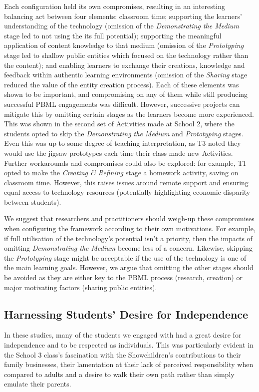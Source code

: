Each configuration held its own compromises, resulting in an interesting balancing act between four elements: classroom time; supporting the learners' understanding of the technology (omission of the \textit{Demonstrating the Medium} stage led to not using the its full potential); supporting the meaningful application of content knowledge to that medium (omission of the \textit{Prototyping} stage led to shallow public entities which focused on the technology rather than the content); and enabling learners to exchange their creations, knowledge and feedback within authentic learning environments (omission of the \textit{Sharing} stage reduced the value of the entity creation process). Each of these elements was shown to be important, and compromising on any of them while still producing successful PBML engagements was difficult. However, successive projects can mitigate this by omitting certain stages as the learners become more experienced. This was shown in the second set of Activities made at School 2, where the students opted to skip the \textit{Demonstrating the Medium} and \textit{Prototyping} stages. Even this was up to some degree of teaching interpretation, as T3 noted they would use the jigsaw prototypes each time their class made new Activities. Further workarounds and compromises could also be explored: for example, T1 opted to make the \textit{Creating \& Refining} stage a homework activity, saving on classroom time. However, this raises issues around remote support and ensuring equal access to technology resources (potentially highlighting economic disparity between students).

We suggest that researchers and practitioners should weigh-up these compromises when configuring the framework according to their own motivations. For example, if full utilisation of the technology's potential isn't a priority, then the impacts of omitting \textit{Demonstrating the Medium} become less of a concern. Likewise, skipping the \textit{Prototyping} stage might be acceptable if the use of the technology is one of the main learning goals. However, we argue that omitting the other stages should be avoided as they are either key to the PBML process (research, creation) or major motivating factors (sharing public entities).

\subsection{Harnessing Students' Desire for Independence}
In these studies, many of the students we engaged with had a great desire for independence and to be respected as individuals. This was particularly evident in the School 3 class's fascination with the Showchildren's contributions to their family businesses, their lamentation at their lack of perceived responsibility when compared to adults and a desire to walk their own path rather than simply emulate their parents.

